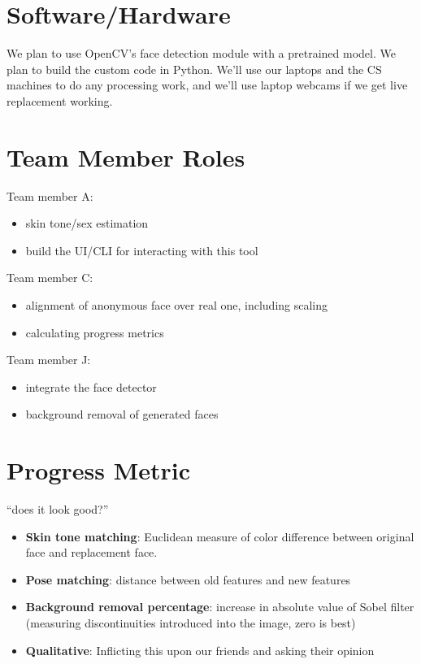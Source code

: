 \section*{Software/Hardware}

We plan to use OpenCV's face detection module with a pretrained model.
We plan to build the custom code in Python. We'll use our laptops and the CS machines to do any processing work, and we'll use laptop webcams if we get live replacement working.

\pagebreak

\section*{Team Member Roles}


Team member A:
\begin{itemize}
    \item skin tone/sex estimation
    \item build the UI/CLI for interacting with this tool
\end{itemize}

Team member C:

\begin{itemize}
    \item alignment of anonymous face over real one, including scaling
    \item calculating progress metrics
\end{itemize}

Team member J:
\begin{itemize}
    \item integrate the face detector
    \item background removal of generated faces
\end{itemize}


\section*{Progress Metric}


``does it look good?''

\begin{itemize}
    \item \textbf{Skin tone matching}: Euclidean measure of color difference between original face and replacement face.
    \item \textbf{Pose matching}: distance between old features and new features
    \item \textbf{Background removal percentage}: increase in absolute value of Sobel filter (measuring discontinuities introduced into the image, zero is best)
    \item \textbf{Qualitative}: Inflicting this upon our friends and asking their opinion
\end{itemize}

